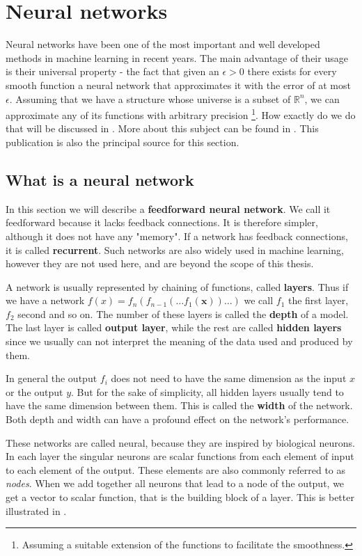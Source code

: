 \section{Neural networks}
Neural networks have been one of the most important and well developed methods in machine learning in recent years. The main advantage of their usage is their universal property - the fact that given an $\epsilon>0$ there exists for every smooth function a neural network that approximates it with the error of at most $\epsilon$. Assuming that we have a structure whose universe is a subset of $\mathbb{R}^n$, we can approximate any of its functions with arbitrary precision \footnote{Assuming a suitable extension of the functions to facilitate the smoothness.}. How exactly do we do that will be discussed in . More about this subject can be found in \cite{neural}. This publication is also the principal source for this section.

\subsection{What is a neural network}
In this section we will describe a \textbf{feedforward neural network}. We call it feedforward because it lacks feedback connections. It is therefore simpler, although it does not have any "memory". If a network has feedback connections, it is called \textbf{recurrent}. Such networks are also widely used in machine learning, however they are not used here, and are beyond the scope of this thesis.

A network is usually represented by chaining of functions, called \textbf{layers}. Thus if we have a network $f(x)=f_n(f_{n-1}(\dots f_1(\textbf{x}))\dots)$ we call $f_1$ the first layer, $f_2$ second and so on. The number of these layers is called the \textbf{depth} of a model. The last layer is called \textbf{output layer}, while the rest are called \textbf{hidden layers} since we usually can not interpret the meaning of the data used and produced by them.

In general the output $f_i$ does not need to have the same dimension as the input $x$ or the output $y$. But for the sake of simplicity, all hidden layers usually tend to have the same dimension between them. This is called the \textbf{width} of the network. Both depth and width can have a profound effect on the network's performance. 

These networks are called neural, because they are inspired by biological neurons. In each layer the singular neurons are scalar functions from each element of input to each element of the output. These elements are also commonly referred to as \textit{nodes}. When we add together all neurons that lead to a node of the output, we get a vector to scalar function, that is the building block of a layer. This is better illustrated in .


